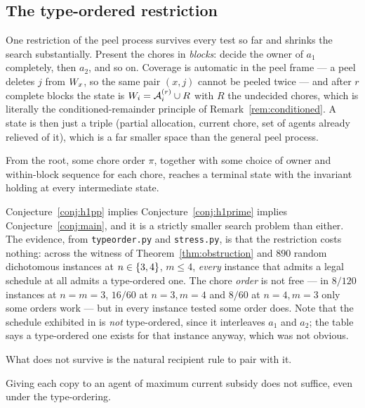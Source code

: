 \subsection{The type-ordered restriction}
\label{sec:typeorder}

One restriction of the peel process survives every test so far and shrinks the
search substantially. Present the chores in \emph{blocks}: decide the owner of
$a_1$ completely, then $a_2$, and so on. Coverage is automatic in the peel frame
--- a peel deletes $j$ from $W_x$, so the same pair $(x,j)$ cannot be
peeled twice --- and after $r$ complete blocks the state is
$W_i = \mathcal{A}^{(r)}_i \cup R$ with $R$ the undecided chores, which is
literally the conditioned-remainder principle of Remark~\ref{rem:conditioned}.
A state is then just a triple (partial allocation, current chore, set of agents
already relieved of it), which is a far smaller space than the general peel
process.

\begin{conjecture}
\label{conj:h1pp}
From the root, some chore order $\pi$, together with some choice of owner and
within-block sequence for each chore, reaches a terminal state with the
invariant holding at every intermediate state.
\end{conjecture}

Conjecture~\ref{conj:h1pp} implies Conjecture~\ref{conj:h1prime} implies
Conjecture~\ref{conj:main}, and it is a strictly smaller search problem than
either. The evidence, from \texttt{typeorder.py} and \texttt{stress.py}, is that
the restriction costs nothing: across the witness of
Theorem~\ref{thm:obstruction} and $890$ random dichotomous instances at
$n \in \left\{3,4\right\}$, $m \le 4$, \emph{every} instance that admits a legal schedule
at all admits a type-ordered one. The chore \emph{order} is not free --- in
$8/120$ instances at $n = m = 3$, $16/60$ at $n=3,m=4$ and $8/60$ at $n=4,m=3$
only some orders work --- but in every instance tested some order does. Note
that the schedule exhibited in  is \emph{not} type-ordered,
since it interleaves $a_1$ and $a_2$; the table says a type-ordered one exists
for that instance anyway, which was not obvious.

What does not survive is the natural recipient rule to pair with it.

\begin{proposition}
\label{prop:f4}
Giving each copy to an agent of maximum current subsidy does not suffice, even
under the type-ordering.
\end{proposition}

